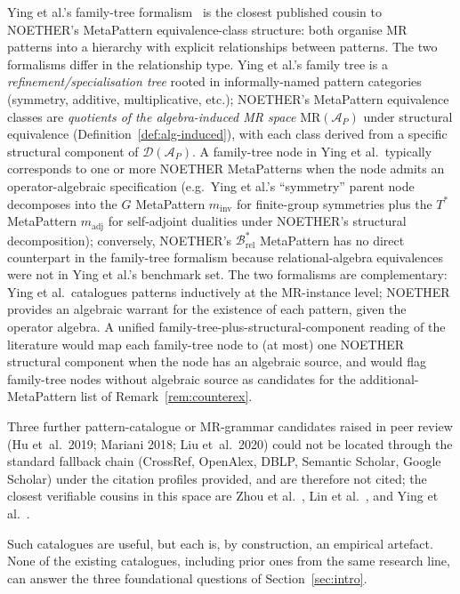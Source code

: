 \documentclass[acmsmall,screen,review]{acmart}
\begin{document}
Ying et al.'s family-tree formalism~\cite{Ying2025MRPatterns} is the closest published cousin to NOETHER's MetaPattern equivalence-class structure: both organise MR patterns into a hierarchy with explicit relationships between patterns. The two formalisms differ in the relationship type. Ying et al.'s family tree is a \emph{refinement/specialisation tree} rooted in informally-named pattern categories (symmetry, additive, multiplicative, etc.); NOETHER's MetaPattern equivalence classes are \emph{quotients of the algebra-induced MR space} $\mathrm{MR}(\mathcal{A}_P)$ under structural equivalence (Definition~\ref{def:alg-induced}), with each class derived from a specific structural component of $\mathcal{D}(\mathcal{A}_P)$. A family-tree node in Ying et al.\ typically corresponds to one or more NOETHER MetaPatterns when the node admits an operator-algebraic specification (e.g.\ Ying et al.'s ``symmetry'' parent node decomposes into the $G$ MetaPattern $m_{\mathrm{inv}}$ for finite-group symmetries plus the $T^{*}$ MetaPattern $m_{\mathrm{adj}}$ for self-adjoint dualities under NOETHER's structural decomposition); conversely, NOETHER's $\mathcal{B}^{*}_{\mathrm{rel}}$ MetaPattern has no direct counterpart in the family-tree formalism because relational-algebra equivalences were not in Ying et al.'s benchmark set. The two formalisms are complementary: Ying et al.\ catalogues patterns inductively at the MR-instance level; NOETHER provides an algebraic warrant for the existence of each pattern, given the operator algebra. A unified family-tree-plus-structural-component reading of the literature would map each family-tree node to (at most) one NOETHER structural component when the node has an algebraic source, and would flag family-tree nodes without algebraic source as candidates for the additional-MetaPattern list of Remark~\ref{rem:counterex}.

Three further pattern-catalogue or MR-grammar candidates raised in peer review (Hu et~al.\ 2019; Mariani 2018; Liu et~al.\ 2020) could not be located through the standard fallback chain (CrossRef, OpenAlex, DBLP, Semantic Scholar, Google Scholar) under the citation profiles provided, and are therefore not cited; the closest verifiable cousins in this space are Zhou et al.~\cite{Zhou2020SymmetryMRP}, Lin et al.~\cite{Lin2018HierarchicalMR}, and Ying et al.~\cite{Ying2025MRPatterns}.

Such catalogues are useful, but each is, by construction, an empirical artefact. None of the existing catalogues, including prior ones from the same research line, can answer the three foundational questions of Section~\ref{sec:intro}.
\end{document}
